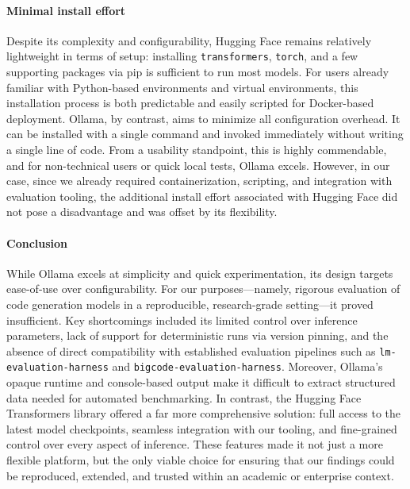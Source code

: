 \paragraph{Minimal install effort}
Despite its complexity and configurability, Hugging Face remains relatively lightweight in terms of setup: installing \texttt{transformers}, \texttt{torch}, and a few supporting packages via pip is sufficient to run most models. For users already familiar with Python-based environments and virtual environments, this installation process is both predictable and easily scripted for Docker-based deployment. Ollama, by contrast, aims to minimize all configuration overhead. It can be installed with a single command and invoked immediately without writing a single line of code. From a usability standpoint, this is highly commendable, and for non-technical users or quick local tests, Ollama excels. However, in our case, since we already required containerization, scripting, and integration with evaluation tooling, the additional install effort associated with Hugging Face did not pose a disadvantage and was offset by its flexibility.

\paragraph{Conclusion}
While Ollama excels at simplicity and quick experimentation, its design targets ease-of-use over configurability. For our purposes---namely, rigorous evaluation of code generation models in a reproducible, research-grade setting---it proved insufficient. Key shortcomings included its limited control over inference parameters, lack of support for deterministic runs via version pinning, and the absence of direct compatibility with established evaluation pipelines such as \texttt{lm-evaluation-harness} and \texttt{bigcode-evaluation-harness}. Moreover, Ollama's opaque runtime and console-based output make it difficult to extract structured data needed for automated benchmarking. In contrast, the Hugging Face Transformers library offered a far more comprehensive solution: full access to the latest model checkpoints, seamless integration with our tooling, and fine-grained control over every aspect of inference. These features made it not just a more flexible platform, but the only viable choice for ensuring that our findings could be reproduced, extended, and trusted within an academic or enterprise context.

